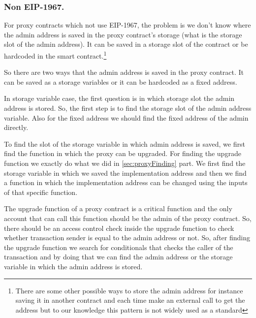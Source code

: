 \subsubsection{Non EIP-1967.}
For proxy contracts which not use EIP-1967, the problem is we don't know where the admin address is saved in the proxy contract's storage (what is the storage slot of the admin address). It can be saved in a storage slot of the contract or be hardcoded in the smart contract.\footnote{There are some other possible ways to store the admin address for instance saving it in another contract and each time make an external call to get the address but to our knowledge this pattern is not widely used as a standard}

So there are two ways that the admin address is saved in the proxy contract. It can be saved as a storage variables or it can be hardcoded as a fixed address.

In storage variable case, the first question is in which storage slot the admin address is stored. So, the first step is to find the storage slot of the admin address variable. Also for the fixed address we should find the fixed address of the admin directly.

To find the slot of the storage variable in which admin address is saved, we first find the function in which the proxy can be upgraded. For finding the upgrade function we exactly do what we did in \ref{sec:proxyFinding} part. We first find the storage variable in which we saved the implementation address and then we find a function in which the implementation address can be changed using the inputs of that specific function. 

The upgrade function of a proxy contract is a critical function and the only account that can call this function should be the admin of the proxy contract. So, there should be an access control check inside the upgrade function to check whether transaction sender is equal to the admin address or not.
So, after finding the upgrade function we search for conditionals that checks the caller of the transaction and by doing that we can find the admin address or the storage variable in which the admin address is stored.


